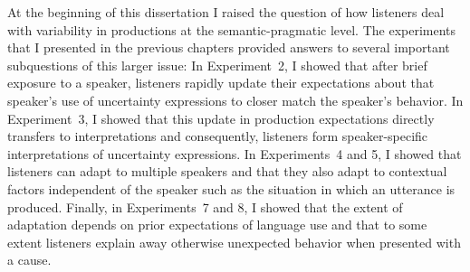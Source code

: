 

At the beginning of this dissertation I raised the question of how listeners deal with variability in productions at the semantic-pragmatic level. The experiments that I presented in the previous chapters provided answers to several important subquestions of this larger issue: In Experiment~2, I showed that after brief exposure to a speaker, listeners rapidly update their expectations about that speaker's use of uncertainty expressions to closer match the speaker's behavior. In Experiment~3, I showed that this update in production expectations directly transfers to interpretations and consequently, listeners form speaker-specific interpretations of uncertainty expressions. In Experiments~4 and 5, I showed that listeners can adapt to multiple speakers and that they also adapt to contextual factors independent of the speaker such as the situation in which an utterance is produced. Finally, in Experiments~7 and 8, I showed that the extent of adaptation depends on prior expectations of language use and that to some extent listeners explain away otherwise unexpected behavior when presented with a cause.

